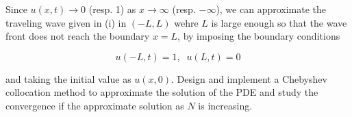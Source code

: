 Since $u(x,t)\to0$ (resp. 1) as $x\to\infty$ (resp. $-\infty$), we can approximate the traveling
wave given in (i) in $(-L,L)$ wehre $L$ is large enough so that the wave front does not reach the
boundary $x=L$, by imposing the boundary conditions

$$u(-L,t) = 1,\;\;u(L,t) = 0$$

and taking the initial value as $u(x,0)$. Design and implement a Chebyshev collocation method to
approximate the solution of the PDE and study the convergence if the approximate solution as $N$ is
increasing.\\

\begin{solution}\renewcommand{\qedsymbol}{}\ \\
\end{solution}

\newpage

\newpage